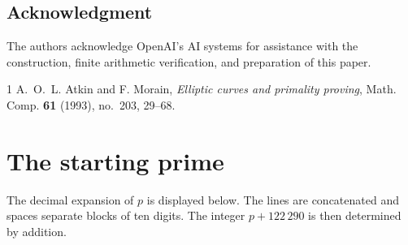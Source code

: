 \documentclass[11pt]{amsart}
\theoremstyle{definition}
\begin{document}
\subsection*{Acknowledgment}
The authors acknowledge OpenAI's AI systems for assistance with the
construction, finite arithmetic verification, and preparation of this paper.

\begin{thebibliography}{1}
A.~O.~L. Atkin and F. Morain,
\emph{Elliptic curves and primality proving},
Math. Comp. \textbf{61} (1993), no.~203, 29--68.
\end{thebibliography}

\appendix
\section{The starting prime}\label{app:p}
The decimal expansion of $p$ is displayed below. The lines are concatenated
and spaces separate blocks of ten digits. The integer $p+122\,290$ is then
determined by addition.

\end{document}
